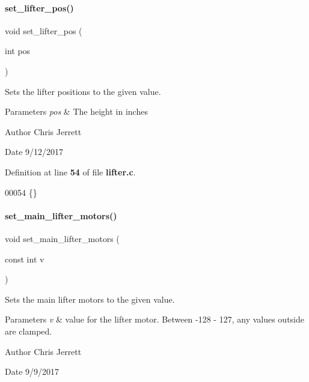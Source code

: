 \paragraph{set\+\_\+lifter\+\_\+pos()}
{\footnotesize\ttfamily void set\+\_\+lifter\+\_\+pos (\begin{DoxyParamCaption}\item[{int}]{pos }\end{DoxyParamCaption})}



Sets the lifter positions to the given value. 


\begin{DoxyParams}{Parameters}
{\em pos} & The height in inches \\
\hline
\end{DoxyParams}
\begin{DoxyAuthor}{Author}
Chris Jerrett 
\end{DoxyAuthor}
\begin{DoxyDate}{Date}
9/12/2017 
\end{DoxyDate}


Definition at line \textbf{ 54} of file \textbf{ lifter.\+c}.


\begin{DoxyCode}
00054 \{\}
\end{DoxyCode}
\mbox{\label{a00107_ad00a195af30f246924d6e1a30095b882}} 
\paragraph{set\+\_\+main\+\_\+lifter\+\_\+motors()}
{\footnotesize\ttfamily void set\+\_\+main\+\_\+lifter\+\_\+motors (\begin{DoxyParamCaption}\item[{const int}]{v }\end{DoxyParamCaption})}



Sets the main lifter motors to the given value. 


\begin{DoxyParams}{Parameters}
{\em v} & value for the lifter motor. Between -\/128 -\/ 127, any values outside are clamped. \\
\hline
\end{DoxyParams}
\begin{DoxyAuthor}{Author}
Chris Jerrett 
\end{DoxyAuthor}
\begin{DoxyDate}{Date}
9/9/2017 
\end{DoxyDate}


